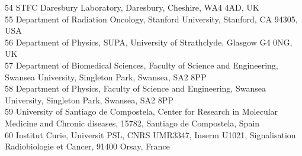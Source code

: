 {\begin{tabbing}
     54 \> STFC Daresbury Laboratory, Daresbury, Cheshire, WA4 4AD, UK\\
     55 \> Department of Radiation Oncology, Stanford University, Stanford, CA 94305, USA\\
     56 \> Department of Physics, SUPA, University of Strathclyde, Glasgow G4 0NG, UK\\
     57 \> Department of Biomedical Sciences, Faculty of Science and Engineering, Swansea University, Singleton Park, Swansea, SA2 8PP\\
     58 \> Department of Physics, Faculty of Science and Engineering, Swansea University, Singleton Park, Swansea, SA2 8PP\\
     59 \> University of Santiago de Compostela, Center for Research in Molecular Medicine and Chronic diseases, 15782, Santiago de Compostela, Spain\\
     60 \> Institut Curie, Universit PSL, CNRS UMR3347, Inserm U1021, Signalisation Radiobiologie et Cancer, 91400 Orsay, France\\
    ~   \> \\
  \end{tabbing}
}
